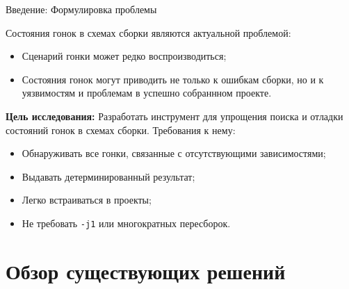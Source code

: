     \begin{frame}{Введение: Формулировка проблемы}

        Состояния гонок в схемах сборки являются актуальной проблемой:

        \begin{itemize}
            \item Сценарий гонки может редко воспроизводиться;
            \item Состояния гонок могут приводить не только к ошибкам сборки, но и к уязвимостям и проблемам в успешно собраннном проекте.
        \end{itemize}

        \textbf{Цель исследования:} Разработать инструмент для упрощения поиска и отладки состояний гонок в схемах сборки. Требования к нему:

        \begin{itemize}
            \item Обнаруживать все гонки, связанные с отсутствующими зависимостями;
            \item Выдавать детерминированный результат;
            \item Легко встраиваться в проекты;
            \item Не требовать \texttt{-j1} или многократных пересборок.
        \end{itemize}

    \end{frame}


    \section{Обзор существующих решений}

